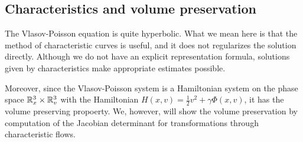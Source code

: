 \documentclass[11pt]{amsart}
\begin{document}
\subsection{Characteristics and volume preservation}

The Vlasov-Poisson equation is quite hyperbolic.
What we mean here is that the method of characteristic curves is useful, and it does not regularizes the solution directly.
Although we do not have an explicit representation formula, solutions given by characteristics make appropriate estimates possible.

Moreover, since the Vlasov-Poisson system is a Hamiltonian system on the phase space $\mathbb{R}_x^3\times\mathbb{R}_v^3$ with the Hamiltonian $H(x,v)=\frac12v^2+\gamma\Phi(x,v)$, it has the volume preserving propoerty.
We, however, will show the volume preservation by computation of the Jacobian determinant for transformations through characteristic flows.
\end{document}
